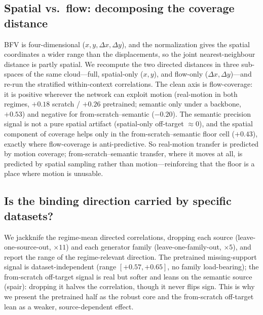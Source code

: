 \documentclass[runningheads]{llncs}
\begin{document}
\subsection{Spatial vs.\ flow: decomposing the coverage distance}
BFV is four-dimensional ($x,y,\Delta x,\Delta y$), and the normalization gives
the spatial coordinates a wider range than the displacements, so the joint
nearest-neighbour distance is partly spatial. We recompute the two directed
distances in three sub-spaces of the same cloud---full, spatial-only ($x,y$),
and flow-only ($\Delta x,\Delta y$)---and re-run the stratified within-context
correlations. The clean axis is flow-coverage: it is positive wherever the
network can exploit motion (real-motion in both regimes, $+0.18$ scratch /
$+0.26$ pretrained; semantic only under a backbone, $+0.53$) and negative for
from-scratch--semantic ($-0.20$). The semantic precision signal is not a pure
spatial artifact (spatial-only off-target $\approx0$), and the spatial component
of coverage helps only in the from-scratch--semantic floor cell ($+0.43$),
exactly where flow-coverage is anti-predictive. So real-motion transfer is
predicted by motion coverage; from-scratch--semantic transfer, where it moves at
all, is predicted by spatial sampling rather than motion---reinforcing that the
floor is a place where motion is unusable.

\subsection{Is the binding direction carried by specific datasets?}
We jackknife the regime-mean directed correlations, dropping each source
(leave-one-source-out, $\times 11$) and each generator family
(leave-one-family-out, $\times 5$), and report the range of the
regime-relevant direction. The pretrained missing-support signal is
dataset-independent (range $[{+}0.57,{+}0.65]$, no family load-bearing); the
from-scratch off-target signal is real but softer and leans on the semantic
source (spair): dropping it halves the correlation, though it never flips sign.
This is why we present the pretrained half as the robust core and the
from-scratch off-target lean as a weaker, source-dependent effect.
\begin{table}[h]\centering\small
\resizebox{\linewidth}{!}{}
\caption{Per-regime source/family jackknife. ``Span'' is the spread of the
regime-relevant correlation over all 16 single drops.}
\label{tab:new_jackknife}
\end{table}
\end{document}
